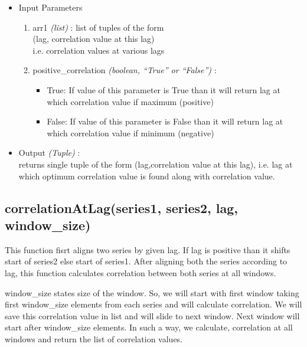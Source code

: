 \begin{itemize}
 \item Input Parameters
 
 \begin{enumerate}
  \item arr1 \textit{(list)} : list of tuples of the form \\ (lag, correlation 
value at this lag) \\ i.e. correlation values at various lags
  \item positive\_correlation \textit{(boolean, ``True'' or ``False'')} : 
      \begin{itemize}
       \item True: If value of this parameter is True than it will return lag 
at which correlation value if maximum (positive)
       \item False: If value of this parameter is False than it will return lag 
at which correlation value if minimum (negative)
      \end{itemize}

 \end{enumerate}

 \item Output \textit{(Tuple)} : \\
  returns single tuple of the form (lag,correlation value at this lag), i.e. 
lag at which optimum correlation value is found along with correlation value.
 
\end{itemize}


\subsection{correlationAtLag(series1, series2, lag, window\_size)}

This function fisrt aligns two series by given lag. If lag is positive than it 
shifts start of series2 else start of series1. After aligning both the series 
according to lag, this function calculates correlation between both series at 
all windows. 

window\_size states size of the window. So, we will start with first window 
taking first window\_size elements from each series and will calculate 
correlation. We will save this correlation value in list and will slide to next 
window. Next window will start after window\_size elements. In such a way, we 
calculate, correlation at all windows and return the list of correlation values.



